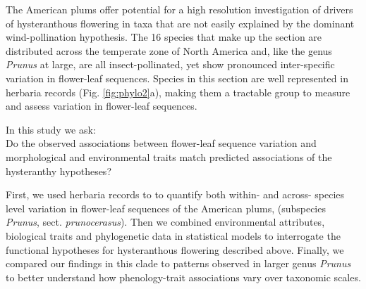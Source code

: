 \documentclass{article}[11pt]
\begin{document}
The American plums offer potential for a high resolution investigation of drivers of hysteranthous flowering in taxa that are not easily explained by the dominant wind-pollination hypothesis. The 16 species that make up the section are distributed across the temperate zone of North America and, like the genus \textit{Prunus} at large, are all insect-pollinated, yet show pronounced inter-specific variation in flower-leaf sequences. Species in this section are well represented in herbaria records (Fig. \ref{fig:phylo2}a), making them a tractable group to measure and assess variation in flower-leaf sequences.

\noindent In this study we ask:\\

Do the observed associations between flower-leaf sequence variation and morphological and environmental traits match predicted associations of the hysteranthy hypotheses? 

\noindent First, we used herbaria records to to quantify both within- and across- species level variation in flower-leaf sequences of the American plums, (subspecies  \textit{Prunus}, sect. \textit{prunocerasus}).
Then we combined environmental attributes, biological traits and phylogenetic data in statistical models to interrogate the functional hypotheses for hysteranthous flowering described above. Finally, we compared our findings in this clade to patterns observed in larger genus \emph{Prunus} to better understand how phenology-trait associations vary over taxonomic scales.


\end{document}
